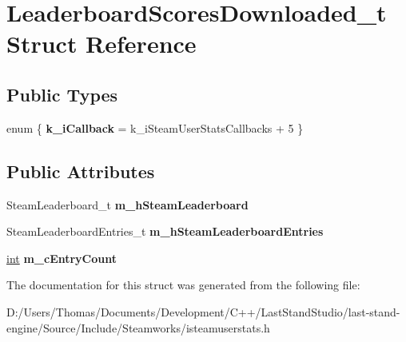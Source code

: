 \hypertarget{structLeaderboardScoresDownloaded__t}{}\section{Leaderboard\+Scores\+Downloaded\+\_\+t Struct Reference}
\label{structLeaderboardScoresDownloaded__t}
\subsection*{Public Types}
\begin{DoxyCompactItemize}
\item 
\hypertarget{structLeaderboardScoresDownloaded__t_a5fb8ef20b9ee4ca4b01ff82844cd27ca}{}enum \{ {\bfseries k\+\_\+i\+Callback} = k\+\_\+i\+Steam\+User\+Stats\+Callbacks + 5
 \}\label{structLeaderboardScoresDownloaded__t_a5fb8ef20b9ee4ca4b01ff82844cd27ca}

\end{DoxyCompactItemize}
\subsection*{Public Attributes}
\begin{DoxyCompactItemize}
\item 
\hypertarget{structLeaderboardScoresDownloaded__t_a19677073d79576524a1f9fba5ba07af7}{}Steam\+Leaderboard\+\_\+t {\bfseries m\+\_\+h\+Steam\+Leaderboard}\label{structLeaderboardScoresDownloaded__t_a19677073d79576524a1f9fba5ba07af7}

\item 
\hypertarget{structLeaderboardScoresDownloaded__t_ad3e5ed2be7790d1b97c2f99dd3a5643a}{}Steam\+Leaderboard\+Entries\+\_\+t {\bfseries m\+\_\+h\+Steam\+Leaderboard\+Entries}\label{structLeaderboardScoresDownloaded__t_ad3e5ed2be7790d1b97c2f99dd3a5643a}

\item 
\hypertarget{structLeaderboardScoresDownloaded__t_ac6a9ac2e82319bb1a331254e3157ceeb}{}\hyperlink{SDL__thread_8h_a6a64f9be4433e4de6e2f2f548cf3c08e}{int} {\bfseries m\+\_\+c\+Entry\+Count}\label{structLeaderboardScoresDownloaded__t_ac6a9ac2e82319bb1a331254e3157ceeb}

\end{DoxyCompactItemize}


The documentation for this struct was generated from the following file\+:\begin{DoxyCompactItemize}
\item 
D\+:/\+Users/\+Thomas/\+Documents/\+Development/\+C++/\+Last\+Stand\+Studio/last-\/stand-\/engine/\+Source/\+Include/\+Steamworks/isteamuserstats.\+h\end{DoxyCompactItemize}
